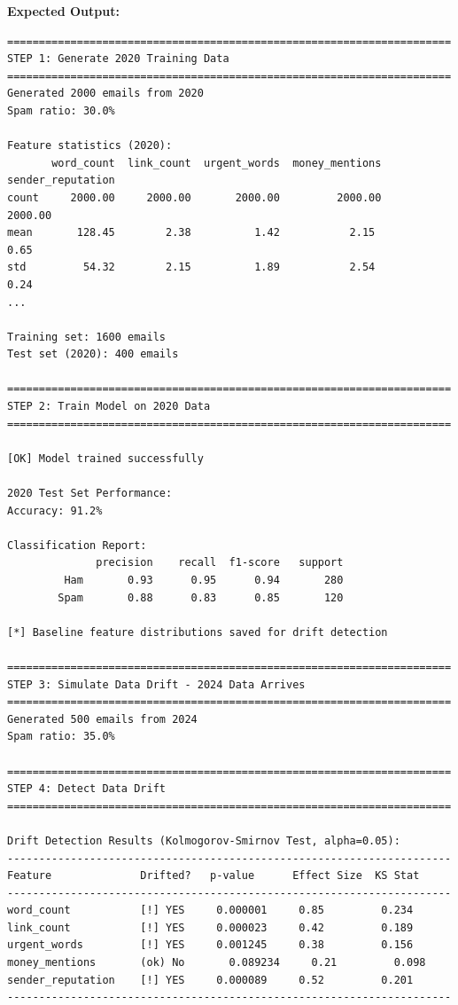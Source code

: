 \textbf{Expected Output:}
\begin{lstlisting}
======================================================================
STEP 1: Generate 2020 Training Data
======================================================================
Generated 2000 emails from 2020
Spam ratio: 30.0%

Feature statistics (2020):
       word_count  link_count  urgent_words  money_mentions  sender_reputation
count     2000.00     2000.00       2000.00         2000.00            2000.00
mean       128.45        2.38          1.42           2.15               0.65
std         54.32        2.15          1.89           2.54               0.24
...

Training set: 1600 emails
Test set (2020): 400 emails

======================================================================
STEP 2: Train Model on 2020 Data
======================================================================

[OK] Model trained successfully

2020 Test Set Performance:
Accuracy: 91.2%

Classification Report:
              precision    recall  f1-score   support
         Ham       0.93      0.95      0.94       280
        Spam       0.88      0.83      0.85       120

[*] Baseline feature distributions saved for drift detection

======================================================================
STEP 3: Simulate Data Drift - 2024 Data Arrives
======================================================================
Generated 500 emails from 2024
Spam ratio: 35.0%

======================================================================
STEP 4: Detect Data Drift
======================================================================

Drift Detection Results (Kolmogorov-Smirnov Test, alpha=0.05):
----------------------------------------------------------------------
Feature              Drifted?   p-value      Effect Size  KS Stat
----------------------------------------------------------------------
word_count           [!] YES     0.000001     0.85         0.234
link_count           [!] YES     0.000023     0.42         0.189
urgent_words         [!] YES     0.001245     0.38         0.156
money_mentions       (ok) No       0.089234     0.21         0.098
sender_reputation    [!] YES     0.000089     0.52         0.201
----------------------------------------------------------------------


\end{lstlisting}
